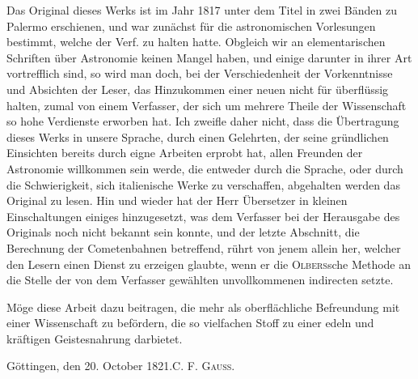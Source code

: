 \NoSourceHead
{}

Das Original dieses Werks ist im Jahr 1817 unter dem Titel  in zwei Bänden zu Palermo erschienen, und war zunächst für die astronomischen Vorlesungen bestimmt, welche der Verf. zu halten hatte. Obgleich wir an elementarischen Schriften über Astronomie keinen Mangel haben, und einige darunter in ihrer Art vortrefflich sind, so wird man doch, bei der Verschiedenheit der Vorkenntnisse und Absichten der Leser, das Hinzukommen einer neuen nicht für überflüssig halten, zumal von einem Verfasser, der sich um mehrere Theile der Wissenschaft so hohe Verdienste erworben hat. Ich zweifle daher nicht, dass die Übertragung dieses Werks in unsere Sprache, durch einen Gelehrten, der seine gründlichen Einsichten bereits durch eigne Arbeiten erprobt hat, allen Freunden der Astronomie willkommen sein werde, die entweder durch die Sprache, oder durch die Schwierigkeit, sich italienische Werke zu verschaffen, abgehalten werden das Original zu lesen. Hin und wieder hat der Herr Übersetzer in kleinen Einschaltungen einiges hinzugesetzt, was dem Verfasser bei der Herausgabe des Originals noch nicht bekannt sein konnte, und der letzte Abschnitt, die Berechnung der Cometenbahnen betreffend, rührt von jenem allein her, welcher den Lesern einen Dienst zu erzeigen glaubte, wenn er die \textsc{Olbers}sche Methode an die Stelle der von dem Verfasser gewählten unvollkommenen indirecten setzte.

Möge diese Arbeit dazu beitragen, die mehr als oberflächliche Befreundung mit einer Wissenschaft zu befördern, die so vielfachen Stoff zu einer edeln und kräftigen Geistesnahrung darbietet.

\bigskip\noindent Göttingen, den 20. October 1821.\hfill C. F. \textsc{Gauss}.
\clearpage
